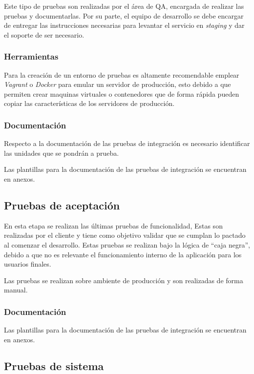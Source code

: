 Este tipo de pruebas son realizadas por el área de QA, encargada de realizar las pruebas y documentarlas. Por su parte, el equipo de desarrollo se debe encargar de entregar las instrucciones necesarias para levantar el servicio en \emph{staging} y dar el soporte de ser necesario.

\subsubsection{Herramientas}

Para la creación de un entorno de pruebas es altamente recomendable emplear \emph{Vagrant} o \emph{Docker} para emular un servidor de producción, esto debido a que permiten crear maquinas virtuales o contenedores que de forma rápida pueden copiar las características de los servidores de producción.

\subsubsection{Documentación}

Respecto a la documentación de las pruebas de integración es necesario identificar las unidades que se pondrán a prueba.

Las plantillas para la documentación de las pruebas de integración se encuentran en anexos.

\subsection{Pruebas de aceptación}

En esta etapa se realizan las últimas pruebas de funcionalidad, Estas son realizadas por el cliente y tiene como objetivo validar que se cumplan lo pactado al comenzar el desarrollo. Estas pruebas se realizan bajo la lógica de “caja negra”, debido a que no es relevante el funcionamiento interno de la aplicación para los usuarios finales. 

Las pruebas se realizan sobre ambiente de producción y son realizadas de forma manual. 


\subsubsection{Documentación}

Las plantillas para la documentación de las pruebas de integración se encuentran en anexos.

\subsection{Pruebas de sistema}

